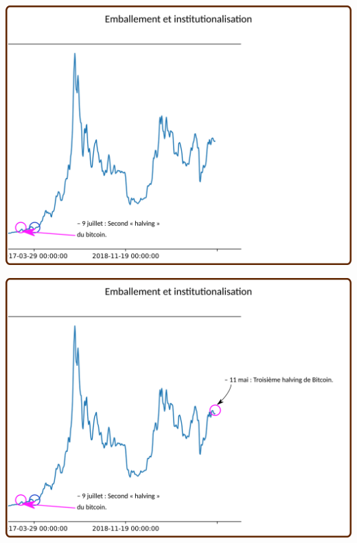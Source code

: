 \documentclass[presentation]{beamer}
\begin{document}
\begin{frame}[label={sec:org63cd6af}]{}
\begin{center}
\includegraphics[width=.95\textwidth]{./Pictures/Timeline/60emballement_halving.png}
\end{center}
\end{frame}

\begin{frame}[label={sec:org4b7ffbd}]{}
\begin{center}
\includegraphics[width=.95\textwidth]{./Pictures/Timeline/61emballement_halving2.png}
\end{center}
\end{frame}
\end{document}
